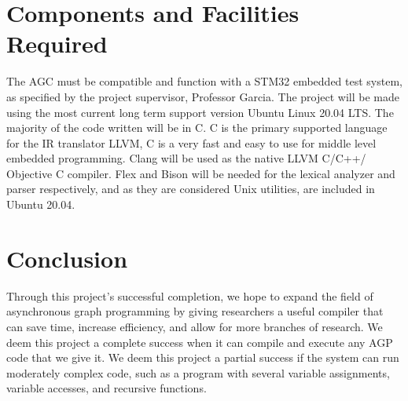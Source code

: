 \documentclass[11pt]{article}
\begin{document}
\section{Components and Facilities Required}

The AGC must be compatible and function with a STM32 embedded test system, as specified by the project supervisor, Professor Garcia. The project will be made using the most current long term support version Ubuntu Linux 20.04 LTS. The majority of the code written will be in C. C is the primary supported language for the IR translator LLVM, C is a very fast and easy to use for middle level embedded programming. Clang will be used as the native LLVM C/C++/ Objective C compiler. Flex and Bison will be needed for the lexical analyzer and parser respectively, and as they are considered Unix utilities, are included in Ubuntu 20.04.



\section{Conclusion}

Through this project’s successful completion, we hope to expand the field of asynchronous graph programming by giving researchers a useful compiler that can save time, increase efficiency, and allow for more branches of research. We deem this project a complete success when it can compile and execute any AGP code that we give it. We deem this project a partial success if the system can run moderately complex code, such as a program with several variable assignments, variable accesses, and recursive functions. 

\pagebreak
\end{document}
